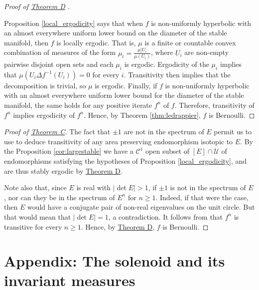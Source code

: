\documentclass[11pt,letterpaper,reqno]{article}
\begin{document}
\begin{proof}[Proof of \hyperlink{theoremD}{Theorem D} ]\label{proofD}

	Proposition \ref{local_ergodicity} says that when $f$
	is non-uniformly hyperbolic with an almost everywhere uniform lower
	bound on the diameter of the stable manifold, then $f$ is locally ergodic.
	That is, $\mu$ is a finite or
	countable convex
	combination of measures of the form $\mu_i =  \frac{\mu \vert U_i}{\mu(U_i)}$, 
	where $U_i$ are non-empty pairwise
	disjoint open sets and each $\mu_i$  is ergodic. 
	Ergodicity of the $\mu_i$ implies that $\mu(U_i \Delta f^{-1}(U_i)) = 0$ for
	every $i$. Transitivity then implies that the decomposition is
	trivial, so $\mu$ is ergodic.
	Finally, if $f$ is non-uniformly hyperbolic with an almost everywhere uniform lower bound for the diameter of the stable manifold, the same holds for any positive iterate $f^n$ of $f$. Therefore, transitivity of $f^n$ implies ergodicity of $f^n$. Hence, by Theorem \ref{thm:ledrappier}, $f$ is Bernoulli.
	


\end{proof}


\begin{proof}[Proof of \hyperlink{theoremC}{Theorem C}]
The fact that $\pm 1$ are not in the spectrum of $E$ permit us to use \cite{Andersson2016} to deduce transitivity of any area preserving endomorphism isotopic to $E$. By the Proposition \ref{cor:largestable} we have a $\mathcal C^1$ open subset of $[E]\cap\mathcal U$ of endomorphisms satisfying the hypotheses of Proposition \ref{local_ergodicity}, and are thus stably ergodic by \hyperlink{theoremD}{Theorem D}.

	Note also that, since $E$ is real with $| \det E | >1 $, if $\pm 1$ is
	not in the spectrum of $E$, nor can they be in the spectrum of $E^n$
	for $n \geq 1$. Indeed, if that were the case, then $E$ would have a
	conjugate pair of non-real eigenvalues on the unit circle. But that
	would mean that $|\det E| = 1$, a contradiction.
	It follows from \cite{Andersson2016} that $f^n$ is transitive for every $n \geq 1$. Hence, by \hyperlink{theoremD}{Theorem D}, $f$ is Bernoulli.
\end{proof}






\appendix
\section{Appendix: The solenoid and its invariant measures}\hypertarget{sec:appendix}{}
\end{document}
